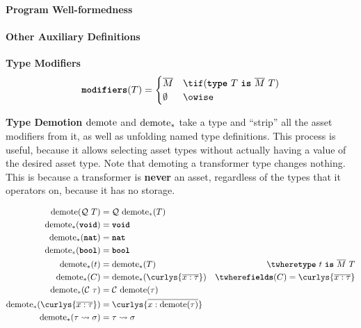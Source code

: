 \documentclass[10pt]{article}
\begin{document}
\framebox{$\Prog~\ok$} \textbf{Program Well-formedness}
\begin{mathpar}
\end{mathpar}

\paragraph{Other Auxiliary Definitions}
 \textbf{Type Modifiers}
\begin{align*}
    \modifiers(T) =
    \begin{cases}
        \overline{M} & \tif (\type~T~\is~\overline{M}~T) \\
        \emptyset & \owise
    \end{cases}
\end{align*}

\framebox{$\demote(\tau) = \sigma$}
 \textbf{Type Demotion}
$\demote$ and $\demote_*$ take a type and ``strip'' all the asset modifiers from it, as well as unfolding named type definitions.
This process is useful, because it allows selecting asset types without actually having a value of the desired asset type.
Note that demoting a transformer type changes nothing.
This is because a transformer is \textbf{never} an asset, regardless of the types that it operators on, because it has no storage.

\begin{align*}
    \demote(\mathcal{Q}~T) &= \mathcal{Q}~\demote_*(T) \\
    \demote_*(\voidt) &= \voidt \\
    \demote_*(\natt) &= \natt \\
    \demote_*(\boolt) &= \boolt \\
    \demote_*(t) &= \demote_*(T) & \twhere \type~t~\is~\overline{M}~T \\
    \demote_*(C) &= \demote_*(\curlys{\overline{x : \tau}}) & \twhere \fields(C) = \curlys{\overline{x : \tau}} \\
    \demote_*(\mathcal{C}~\tau) &= \mathcal{C}~\demote(\tau) \\
    \demote_*(\curlys{\overline{x : \tau}}) &= \curlys{\overline{x : \demote(\tau)}} \\
    \demote_*(\tau \transforms \sigma) &= \tau \transforms \sigma
\end{align*}
\end{document}
